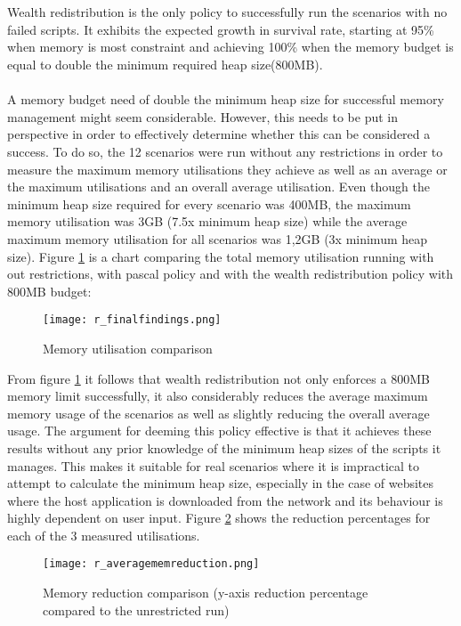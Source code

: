 \documentclass{l4proj}
\begin{document}
\\\\
Wealth redistribution is the only policy to successfully run the scenarios with no failed scripts. It exhibits the expected growth in survival rate, starting at 95\% when memory is most constraint and achieving 100\% when the memory budget is equal to double the minimum required heap size(800MB).
\\\\
\hspace*{3em} A memory budget need of double the minimum heap size for successful memory management might seem considerable. However, this needs to be put in perspective in order to effectively determine whether this can be considered a success. To do so, the 12 scenarios were run without any restrictions in order to measure the maximum memory utilisations they achieve as well as an average or the maximum utilisations and an overall average utilisation. Even though the minimum heap size required for every scenario was 400MB, the maximum memory utilisation was 3GB (7.5x minimum heap size) while the average maximum memory utilisation for all scenarios was 1,2GB (3x minimum heap size). Figure \ref{memreduction} is a chart comparing the total memory utilisation running with out restrictions, with pascal policy and with the wealth redistribution policy with 800MB budget:
\begin{figure}[!ht]
  \centering
    \texttt{[image: r\_finalfindings.png]}
    \caption{Memory utilisation comparison}
    \label{memreduction}
\end{figure}
\newpage
From figure \ref{memreduction} it follows that wealth redistribution not only enforces a 800MB memory limit successfully, it also considerably reduces the average maximum memory usage of the scenarios as well as slightly reducing the overall average usage. The argument for deeming this policy effective is that it achieves these results without any prior knowledge of the minimum heap sizes of the scripts it manages. This makes it suitable for real scenarios where it is impractical to attempt to calculate the minimum heap size, especially in the case of websites where the host application is downloaded from the network and its behaviour is highly dependent on user input. Figure \ref{pc_reduction} shows the reduction percentages for each of the 3 measured utilisations.
\begin{figure}[!ht]
  \centering
    \texttt{[image: r\_averagememreduction.png]}
    \caption{Memory reduction comparison (y-axis reduction percentage compared to the unrestricted run)}
    \label{pc_reduction}
\end{figure}\\
\end{document}
